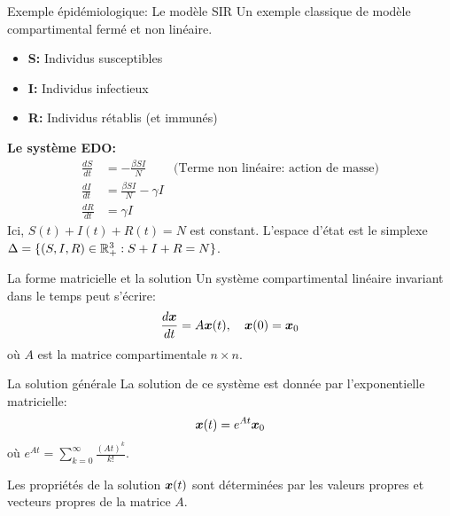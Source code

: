 \documentclass[aspectratio=169]{beamer}\usepackage[]{graphicx}\usepackage[]{xcolor}
\begin{document}
\begin{frame}{Exemple épidémiologique: Le modèle SIR}
    Un exemple classique de modèle compartimental fermé et non linéaire.
    \begin{itemize}
        \item \textbf{S:} Individus susceptibles
        \item \textbf{I:} Individus infectieux
        \item \textbf{R:} Individus rétablis (et immunés)
    \end{itemize}

    \begin{center}
    \end{center}

    \textbf{Le système EDO:}
    \begin{align*}
        \frac{dS}{dt} &= -\frac{\beta S I}{N} \quad &\text{(Terme non linéaire: action de masse)} \\
        \frac{dI}{dt} &= \frac{\beta S I}{N} - \gamma I \\
        \frac{dR}{dt} &= \gamma I
    \end{align*}
    Ici, $S(t)+I(t)+R(t) = N$ est constant. L'espace d'état est le simplexe $\Delta = \{(S,I,R) \in \mathbb{R}_+^3 : S+I+R=N\}$.
\end{frame}


\begin{frame}{La forme matricielle et la solution}
    Un système compartimental linéaire invariant dans le temps peut s'écrire:
    $$ \frac{d\bm{x}}{dt} = A\bm{x}(t), \quad \bm{x}(0) = \bm{x}_0 $$
    où $A$ est la matrice compartimentale $n \times n$.

    \begin{block}{La solution générale}
        La solution de ce système est donnée par l'exponentielle matricielle:
        $$ \bm{x}(t) = e^{At} \bm{x}_0 $$
        où $e^{At} = \sum_{k=0}^{\infty} \frac{(At)^k}{k!}$.
    \end{block}

    Les propriétés de la solution $\bm{x}(t)$ sont déterminées par les valeurs propres et vecteurs propres de la matrice $A$.
\end{frame}
\end{document}

